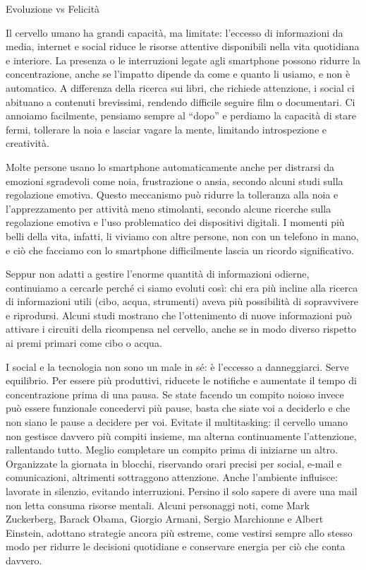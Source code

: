 \documentclass[12pt]{book} %
\begin{document}
\begin{mdframed}[linewidth=1pt]
Evoluzione vs Felicità

Il cervello umano ha grandi capacità, ma limitate: l’eccesso di informazioni da media, internet e social riduce le risorse attentive disponibili nella vita quotidiana e interiore. La presenza o le interruzioni legate agli smartphone possono ridurre la concentrazione, anche se l’impatto dipende da come e quanto li usiamo, e non è automatico. A differenza della ricerca sui libri, che richiede attenzione, i social ci abituano a contenuti brevissimi, rendendo difficile seguire film o documentari. Ci annoiamo facilmente, pensiamo sempre al “dopo” e perdiamo la capacità di stare fermi, tollerare la noia e lasciar vagare la mente, limitando introspezione e creatività.

Molte persone usano lo smartphone automaticamente anche per distrarsi da emozioni sgradevoli come noia, frustrazione o ansia, secondo alcuni studi sulla regolazione emotiva. Questo meccanismo può ridurre la tolleranza alla noia e l'apprezzamento per attività meno stimolanti, secondo alcune ricerche sulla regolazione emotiva e l’uso problematico dei dispositivi digitali. I momenti più belli della vita, infatti, li viviamo con altre persone, non con un telefono in mano, e ciò che facciamo con lo smartphone difficilmente lascia un ricordo significativo.

Seppur non adatti a gestire l’enorme quantità di informazioni odierne, continuiamo a cercarle perché ci siamo evoluti così: chi era più incline alla ricerca di informazioni utili (cibo, acqua, strumenti) aveva più possibilità di sopravvivere e riprodursi. Alcuni studi mostrano che l’ottenimento di nuove informazioni può attivare i circuiti della ricompensa nel cervello, anche se in modo diverso rispetto ai premi primari come cibo o acqua.

I social e la tecnologia non sono un male in sé: è l’eccesso a danneggiarci. Serve equilibrio. Per essere più produttivi, riducete le notifiche e aumentate il tempo di concentrazione prima di una pausa. Se state facendo un compito noioso invece può essere funzionale
concedervi più pause, basta che siate voi a deciderlo e che non siano le pause a decidere per voi. Evitate il multitasking: il cervello umano non gestisce davvero più compiti insieme, ma alterna continuamente l’attenzione, rallentando tutto. Meglio completare un compito prima di iniziarne un altro. Organizzate la giornata in blocchi, riservando orari precisi per social, e-mail e comunicazioni, altrimenti sottraggono attenzione. Anche l’ambiente influisce: lavorate in silenzio, evitando interruzioni. Persino il solo sapere di avere una mail non letta consuma risorse mentali. Alcuni personaggi noti, come Mark Zuckerberg, Barack Obama, Giorgio Armani, Sergio Marchionne e Albert Einstein, adottano strategie ancora più estreme, come vestirsi sempre allo stesso modo per ridurre le decisioni quotidiane e conservare energia per ciò che conta davvero.


\end{mdframed}
\end{document}
